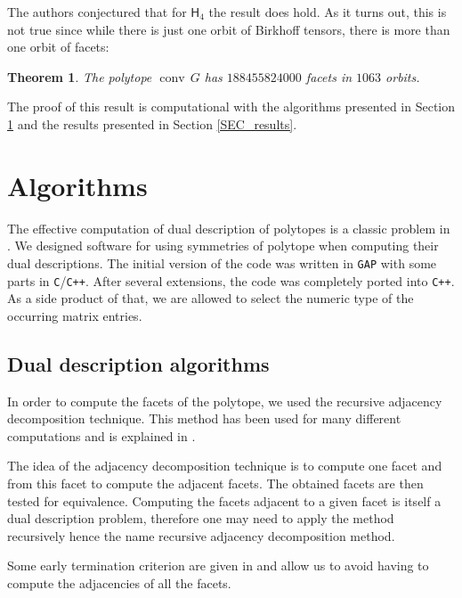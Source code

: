 \documentclass[12pt]{amsart}
\newtheorem{theorem}{Theorem}
\DeclareMathOperator{\conv}{conv}
\begin{document}
The authors conjectured \cite[Problem 8.1]{birkhoff} that for $\mathsf{H}_4$ the
result does hold.
As it turns out, this is not true since while there is just
one orbit of Birkhoff tensors, there is more than one orbit of facets:

\begin{theorem}
The polytope $\conv\, G$ has $188455824000$ facets in $1063$ orbits.
\end{theorem}

The proof of this result is computational with the algorithms presented in
Section \ref{SEC_algorithm} and the results presented in Section \ref{SEC_results}.





\section{Algorithms}\label{SEC_algorithm}

The effective computation of dual description of polytopes is a classic
problem in \cite{HandbookDiscCompGeometry}. We designed software for
using symmetries of polytope when computing their dual descriptions.
The initial version of the code was written in {\tt GAP} with some parts
in {\tt C}/{\tt C++}. After several extensions, the code was completely
ported into {\tt C++}. As a side product of that, we are allowed to
select the numeric type of the occurring matrix entries.


\subsection{Dual description algorithms}

In order to compute the facets of the polytope, we used the recursive adjacency
decomposition technique. This method has been used for many different computations
and is explained in \cite{perfectdim8,montreal,ContactLeech,CUTsmallGraphs}.

The idea of the adjacency decomposition technique is to compute one facet and from
this facet to compute the adjacent facets. The obtained facets are then tested
for equivalence. Computing the facets adjacent to a given facet is itself a
dual description problem, therefore one may need to apply the method recursively
hence the name recursive adjacency decomposition method.

Some early termination criterion are given in \cite{CUTsmallGraphs} and allow us
to avoid having to compute the adjacencies of all the facets.
\end{document}
